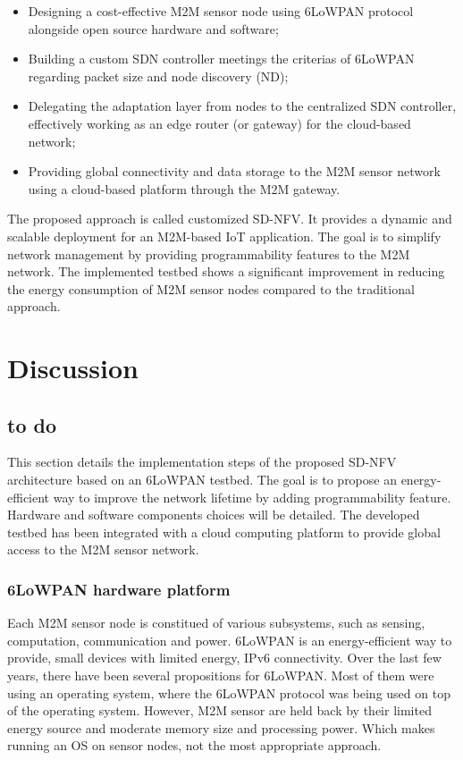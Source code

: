 \documentclass[10pt,journal,compsoc]{IEEEtran}
\begin{document}
\begin{itemize}
    \item Designing a cost-effective M2M sensor node using 6LoWPAN 
    protocol alongside open source hardware and software;
    \item Building a custom SDN controller meetings the criterias of
    6LoWPAN regarding packet size and node discovery (ND);
    \item Delegating the adaptation layer from nodes to the centralized 
    SDN controller, effectively working as an edge router (or gateway) for 
    the cloud-based network;
    \item Providing global connectivity and data storage to the M2M sensor 
    network using a cloud-based platform through the M2M gateway.
\end{itemize}
The proposed approach is called customized SD-NFV. It provides a dynamic 
and scalable deployment for an M2M-based IoT application. The goal is 
to simplify network management by providing programmability features 
to the M2M network. The implemented testbed shows a significant 
improvement in reducing the energy consumption of M2M sensor nodes 
compared to the traditional approach.

\section{Discussion}\label{sec:discussion}
\subsection{to do}

This section details the implementation steps of the proposed SD-NFV 
architecture based on an 6LoWPAN testbed. The goal is to propose 
an energy-efficient way to improve the network lifetime by adding 
programmability feature. Hardware and software components choices 
will be detailed. The developed testbed has been integrated with a cloud 
computing platform to provide global access to the M2M sensor network.

\subsubsection{6LoWPAN hardware platform}

Each M2M sensor node is constitued of various subsystems, such as 
sensing, computation, communication and power. 6LoWPAN is an 
energy-efficient way to provide, small devices with limited energy, 
IPv6 connectivity. Over the last few years, there have been several 
propositions for 6LoWPAN. Most of them were using an operating system, 
where the 6LoWPAN protocol was being used on top of the operating system. 
However, M2M sensor are held back by their limited energy source and 
moderate memory size and processing power. Which makes running an OS 
on sensor nodes, not the most appropriate approach.
\end{document}
